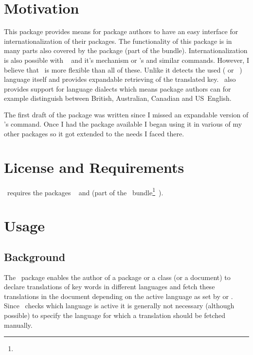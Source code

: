 \documentclass[load-preamble+,babel-options={french,spanish,ngerman,english}]{cnltx-doc}
\begin{document}
\section{Motivation}
This package provides means for package authors to have an easy interface for
internationalization of their packages.  The functionality of this package is
in many parts also covered by the package  (part of the
 bundle).  Internationalization is also possible with
~\cite{pkg:babel} and it's 
mechanism or \KOMAScript's  and similar commands.
However, I believe that \translations\ is more flexible than all of these.
Unlike  it detects the used ( or
~\cite{pkg:polyglossia}) language itself and provides
expandable retrieving of the translated key.  \translations\ also provides
support for language dialects which means package authors can for example
distinguish between British, Australian, Canadian and US~English.

The first draft of the package was written since I missed an expandable
version of 's  command.  Once I had the
package available I began using it in various of my other packages so it got
extended to the needs I faced there.


\section{License and Requirements}\label{sec:license}
\license

\translations\ requires the packages
~\cite{pkg:etoolbox} and  (part of the
\KOMAScript\ bundle\footnote{}~\cite{pkg:koma-script}).


\section{Usage}
\subsection{Background}
The \translations\ package enables the author of a package or a class (or a
document) to declare translations of key words in different languages and
fetch these translations in the document depending on the active language as
set by  or .  Since \translations\ checks which
language is active it is generally not necessary (although possible) to
specify the language for which a translation should be fetched manually.
\end{document}
